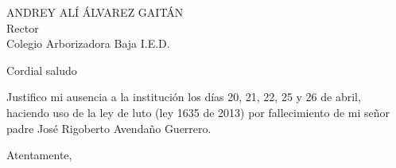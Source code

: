 \documentclass[letterpaper,spanish]{letter}
\date{2 de mayo de 2016}
\begin{document}
\begin{letter}{ANDREY ALÍ ÁLVAREZ GAITÁN\\Rector\\Colegio Arborizadora Baja I.E.D.}
	
\opening{Cordial saludo}
Justifico mi ausencia a la institución los días 20, 21, 22, 25 y 26 de abril, haciendo uso de la ley de luto (ley 1635 de 2013) por fallecimiento de mi señor padre José Rigoberto Avendaño Guerrero.
\closing{Atentamente,}


\end{letter}
\end{document}
